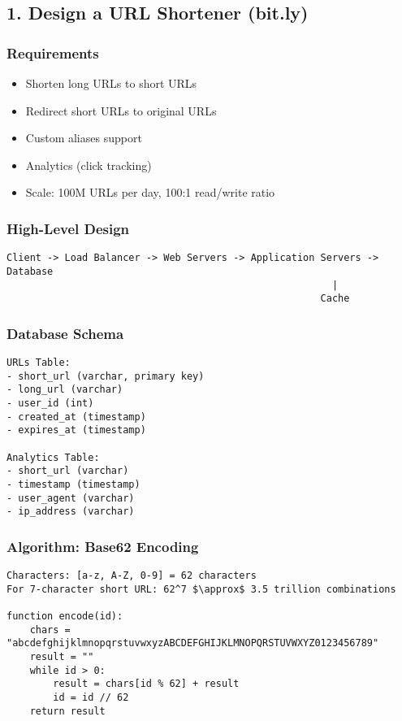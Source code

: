 \documentclass[10pt,a4paper]{article}
\begin{document}
\subsection{1. Design a URL Shortener (bit.ly)}

\subsubsection{Requirements}
\begin{itemize}
\item Shorten long URLs to short URLs
\item Redirect short URLs to original URLs
\item Custom aliases support
\item Analytics (click tracking)
\item Scale: 100M URLs per day, 100:1 read/write ratio
\end{itemize}

\subsubsection{High-Level Design}
\begin{verbatim}
Client -> Load Balancer -> Web Servers -> Application Servers -> Database
                                                        |
                                                      Cache
\end{verbatim}

\subsubsection{Database Schema}
\begin{verbatim}
URLs Table:
- short_url (varchar, primary key)
- long_url (varchar)
- user_id (int)
- created_at (timestamp)
- expires_at (timestamp)

Analytics Table:
- short_url (varchar)
- timestamp (timestamp)
- user_agent (varchar)
- ip_address (varchar)
\end{verbatim}

\subsubsection{Algorithm: Base62 Encoding}
\begin{verbatim}
Characters: [a-z, A-Z, 0-9] = 62 characters
For 7-character short URL: 62^7 $\approx$ 3.5 trillion combinations

function encode(id):
    chars = "abcdefghijklmnopqrstuvwxyzABCDEFGHIJKLMNOPQRSTUVWXYZ0123456789"
    result = ""
    while id > 0:
        result = chars[id % 62] + result
        id = id // 62
    return result
\end{verbatim}
\end{document}
